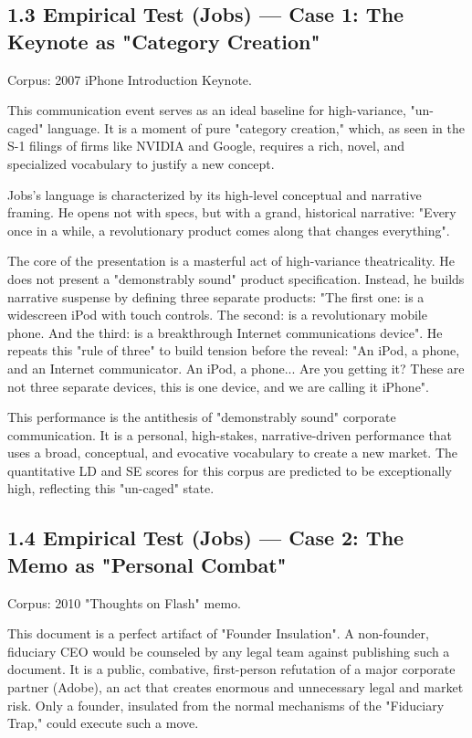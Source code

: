 \documentclass[12pt]{article}
\begin{document}
\subsection{1.3 Empirical Test (Jobs) — Case 1: The Keynote as "Category Creation"}

Corpus: 2007 iPhone Introduction Keynote.

This communication event serves as an ideal baseline for high-variance, "un-caged" language. It is a moment of pure "category creation," which, as seen in the S-1 filings of firms like NVIDIA and Google, requires a rich, novel, and specialized vocabulary to justify a new concept.

Jobs's language is characterized by its high-level conceptual and narrative framing. He opens not with specs, but with a grand, historical narrative: "Every once in a while, a revolutionary product comes along that changes everything".

The core of the presentation is a masterful act of high-variance theatricality. He does not present a "demonstrably sound" product specification. Instead, he builds narrative suspense by defining three separate products: "The first one: is a widescreen iPod with touch controls. The second: is a revolutionary mobile phone. And the third: is a breakthrough Internet communications device". He repeats this "rule of three" to build tension before the reveal: "An iPod, a phone, and an Internet communicator. An iPod, a phone... Are you getting it? These are not three separate devices, this is one device, and we are calling it iPhone".

This performance is the antithesis of "demonstrably sound" corporate communication. It is a personal, high-stakes, narrative-driven performance that uses a broad, conceptual, and evocative vocabulary to create a new market. The quantitative LD and SE scores for this corpus are predicted to be exceptionally high, reflecting this "un-caged" state.

\subsection{1.4 Empirical Test (Jobs) — Case 2: The Memo as "Personal Combat"}

Corpus: 2010 "Thoughts on Flash" memo.

This document is a perfect artifact of "Founder Insulation". A non-founder, fiduciary CEO would be counseled by any legal team against publishing such a document. It is a public, combative, first-person refutation of a major corporate partner (Adobe), an act that creates enormous and unnecessary legal and market risk. Only a founder, insulated from the normal mechanisms of the "Fiduciary Trap," could execute such a move.
\end{document}
